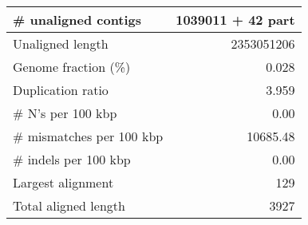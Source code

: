 \documentclass[12pt,a4paper]{article}
\begin{document}
\begin{table}[ht]
\begin{center}
\begin{tabular}{|l*{1}{|r}|}
\# unaligned contigs & 1039011 + 42 part \\ \hline
Unaligned length & 2353051206 \\ \hline
Genome fraction (\%) & 0.028 \\ \hline
Duplication ratio & 3.959 \\ \hline
\# N's per 100 kbp & 0.00 \\ \hline
\# mismatches per 100 kbp & 10685.48 \\ \hline
\# indels per 100 kbp & 0.00 \\ \hline
Largest alignment & 129 \\ \hline
Total aligned length & 3927 \\ \hline
\end{tabular}
\end{center}
\end{table}
\end{document}
